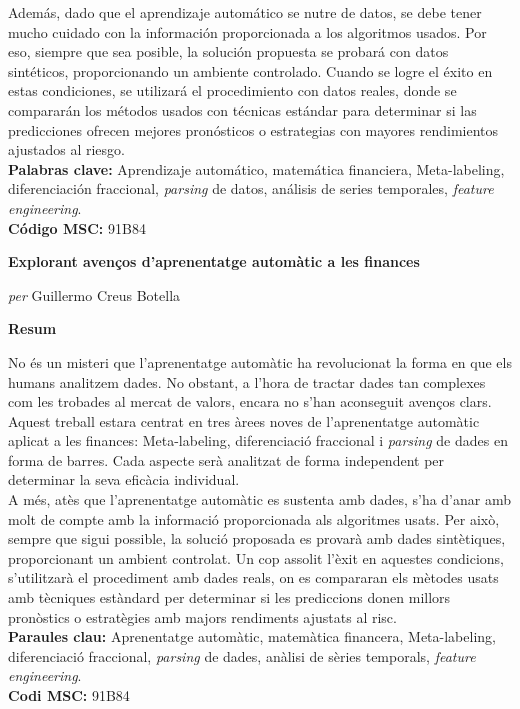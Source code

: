 Además, dado que el aprendizaje automático se nutre de datos, se debe tener 
mucho cuidado con la información proporcionada a los algoritmos usados. Por 
eso, siempre que sea posible, la solución propuesta se probará con datos 
sintéticos, proporcionando un ambiente controlado. Cuando se logre el éxito 
en estas condiciones, se utilizará el procedimiento con datos reales, donde 
se compararán los métodos usados con técnicas estándar para determinar si 
las predicciones ofrecen mejores pronósticos o estrategias con mayores
rendimientos ajustados al riesgo.\\


\textbf{Palabras clave:} Aprendizaje automático, matemática financiera, 
Meta-labeling, diferenciación fraccional, \textit{parsing} de datos, 
análisis de series temporales, \textit{feature engineering}.\\

\textbf{Código MSC:} 91B84

\newpage
\thispagestyle{empty}
\begin{center}
	\Large
	\textbf{Explorant avenços d'aprenentatge automàtic a les finances}
	
	\large
	\vspace{.4cm}
	\textit{per} Guillermo Creus Botella
	
	\vspace{.9cm}
	\textbf{Resum}
\end{center}

No és un misteri que l'aprenentatge automàtic ha revolucionat la forma en
que els humans analitzem dades. No obstant, a l'hora de tractar dades tan 
complexes com les trobades al mercat de valors, encara no s'han aconseguit
avenços clars. Aquest treball estara centrat en tres àrees noves de 
l'aprenentatge automàtic aplicat a les finances: Meta-labeling, 
diferenciació fraccional i \textit {parsing} de dades en forma de barres. 
Cada aspecte serà analitzat de forma independent per determinar la seva 
eficàcia individual.\\

A més, atès que l'aprenentatge automàtic es sustenta amb dades, s'ha d'anar 
amb molt de compte amb la informació proporcionada als algoritmes usats. Per
això, sempre que sigui possible, la solució proposada es provarà amb dades
sintètiques, proporcionant un ambient controlat. Un cop assolit l'èxit en 
aquestes condicions, s'utilitzarà el procediment amb dades reals, on es 
compararan els mètodes usats amb tècniques estàndard per determinar si les 
prediccions donen millors pronòstics o estratègies amb majors rendiments 
ajustats al risc.\\

\textbf{Paraules clau:} Aprenentatge automàtic, matemàtica financera, 
Meta-labeling, diferenciació fraccional, \textit{parsing} de dades, anàlisi 
de sèries temporals, \textit{feature engineering}.\\

\textbf{Codi MSC:} 91B84